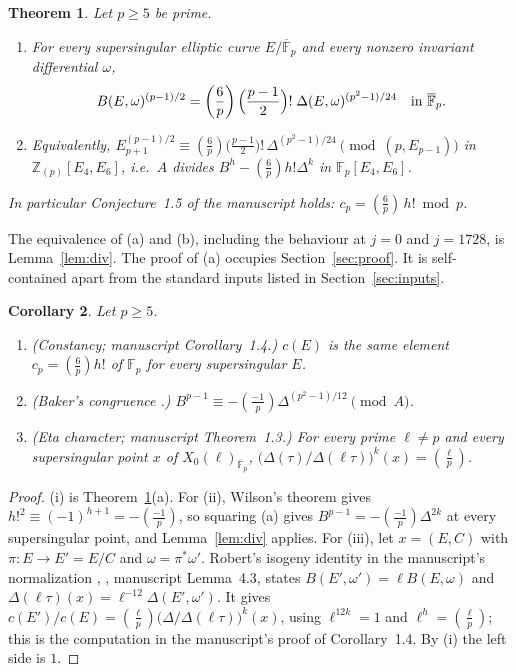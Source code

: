 \documentclass[11pt,a4paper]{article}
\numberwithin{equation}{section}
\newtheorem{theorem}{Theorem}[section]
\newtheorem{corollary}[theorem]{Corollary}
\theoremstyle{definition}
\theoremstyle{remark}
\newcommand{\Fp}{\mathbb F_p}
\newcommand{\Fb}{\overline{\mathbb F}_p}
\newcommand{\Z}{\mathbb Z}
\newcommand{\Lp}[1]{\left(\frac{#1}{p}\right)}
\newcommand{\leg}[2]{\left(\frac{#1}{#2}\right)}
\begin{document}
\begin{theorem}\label{thm:main}
Let $p\ge5$ be prime.
\begin{enumerate}[label=\textup{(\alph*)}]
\item For every supersingular elliptic curve $E/\Fb$ and every nonzero invariant differential
$\omega$,
\[
B(E,\omega)^{(p-1)/2}=\Lp{6}\Bigl(\frac{p-1}{2}\Bigr)!\;\Delta(E,\omega)^{(p^2-1)/24}\quad\text{in }\Fb .
\]
\item Equivalently,
$E_{p+1}^{(p-1)/2}\equiv\Lp6\bigl(\frac{p-1}2\bigr)!\,\Delta^{(p^2-1)/24}\pmod{(p,E_{p-1})}$ in
$\Z_{(p)}[E_4,E_6]$, i.e.\ $A$ divides $B^h-\Lp6h!\Delta^k$ in $\Fp[E_4,E_6]$.
\end{enumerate}
In particular Conjecture~1.5 of the manuscript holds: $c_p=\Lp6\,h!\bmod p$.
\end{theorem}

The equivalence of (a) and (b), including the behaviour at $j=0$ and $j=1728$, is
Lemma~\ref{lem:div}. The proof of (a) occupies Section~\ref{sec:proof}. It is
self-contained apart from the standard inputs listed in Section~\ref{sec:inputs}.

\begin{corollary}\label{cor:consequences}
Let $p\ge5$.
\begin{enumerate}[label=\textup{(\roman*)}]
\item \textup{(Constancy; manuscript Corollary~1.4.)} $c(E)$ is the same element
$c_p=\Lp6h!$ of $\Fp$ for every supersingular $E$.
\item \textup{(Baker's congruence \cite[Theorem~1.4]{Baker98}.)}
$B^{p-1}\equiv-\Lp{-1}\Delta^{(p^2-1)/12}\pmod A$.
\item \textup{(Eta character; manuscript Theorem~1.3.)} For every prime $\ell\ne p$ and every
supersingular point $x$ of $X_0(\ell)_{\Fb}$, $\bigl(\Delta(\tau)/\Delta(\ell\tau)\bigr)^{k}(x)=\leg{\ell}{p}$.
\end{enumerate}
\end{corollary}

\begin{proof}
(i) is Theorem~\ref{thm:main}(a). For (ii), Wilson's theorem gives
$h!^2\equiv(-1)^{h+1}=-\Lp{-1}$, so squaring (a) gives $B^{p-1}=-\Lp{-1}\Delta^{2k}$ at every
supersingular point, and Lemma~\ref{lem:div} applies. For (iii), let $x=(E,C)$ with
$\pi:E\to E'=E/C$ and $\omega=\pi^*\omega'$. Robert's isogeny identity in the manuscript's
normalization \cite[Th\'eor\`eme~B]{Robert80}, \cite[Lemma~2.2]{Baker98}, manuscript
Lemma~4.3, states $B(E',\omega')=\ell B(E,\omega)$ and
$\Delta(\ell\tau)(x)=\ell^{-12}\Delta(E',\omega')$. It gives
$c(E')/c(E)=\leg{\ell}{p}\bigl(\Delta/\Delta(\ell\tau)\bigr)^k(x)$, using $\ell^{12k}=1$ and
$\ell^{h}=\leg{\ell}{p}$; this is the computation in the manuscript's proof of
Corollary~1.4. By (i) the left side is $1$.
\end{proof}
\end{document}
